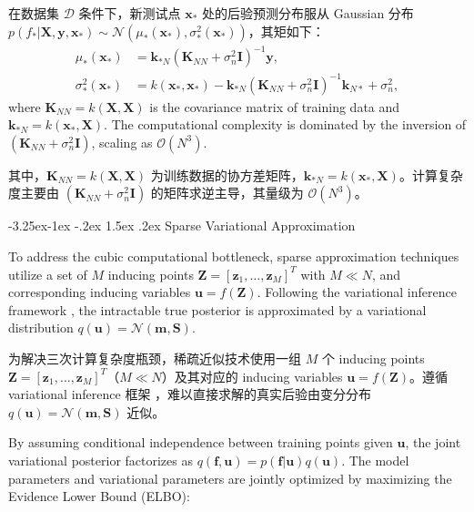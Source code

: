 \documentclass[11pt]{article}
\makeatletter
\renewcommand\subsection{\@startsection{subsection}{2}{\z@}%
                                         {-3.25ex\@plus -1ex \@minus -.2ex}%
                                         {1.5ex \@plus .2ex}%
                                         {\normalfont\fontfamily{phv}\fontsize{14}{17}\bfseries}}
\makeatother
\begin{document}
在数据集 $\mathcal{D}$ 条件下，新测试点 $\mathbf{x}_*$ 处的后验预测分布服从 Gaussian 分布 $p(f_* | \mathbf{X}, \mathbf{y}, \mathbf{x}_*) \sim \mathcal{N}(\mu_*(\mathbf{x}_*), \sigma_*^2(\mathbf{x}_*))$，其矩如下：
\begin{equation}
	\begin{aligned}
		\mu_*(\mathbf{x}_*) &= \mathbf{k}_{*N} (\mathbf{K}_{NN} + \sigma_n^2 \mathbf{I})^{-1} \mathbf{y}, \\
		\sigma_*^2(\mathbf{x}_*) &= k(\mathbf{x}_*, \mathbf{x}_*) - \mathbf{k}_{*N} (\mathbf{K}_{NN} + \sigma_n^2 \mathbf{I})^{-1} \mathbf{k}_{N*} + \sigma_n^2,
	\end{aligned}
\end{equation}
where $\mathbf{K}_{NN} = k(\mathbf{X}, \mathbf{X})$ is the covariance matrix of training data and $\mathbf{k}_{*N} = k(\mathbf{x}_*, \mathbf{X})$. The computational complexity is dominated by the inversion of $(\mathbf{K}_{NN} + \sigma_n^2 \mathbf{I})$, scaling as $\mathcal{O}(N^3)$.

其中，$\mathbf{K}_{NN} = k(\mathbf{X}, \mathbf{X})$ 为训练数据的协方差矩阵，$\mathbf{k}_{*N} = k(\mathbf{x}_*, \mathbf{X})$。计算复杂度主要由 $(\mathbf{K}_{NN} + \sigma_n^2 \mathbf{I})$ 的矩阵求逆主导，其量级为 $\mathcal{O}(N^3)$。



\subsection{Sparse Variational Approximation} \label{s:sec2.2}

To address the cubic computational bottleneck, sparse approximation techniques utilize a set of $M$ inducing points $\mathbf{Z} = [\mathbf{z}_1, \ldots, \mathbf{z}_M]^T$ with $M \ll N$, and corresponding inducing variables $\mathbf{u} = f(\mathbf{Z})$. Following the variational inference framework \citep{Titsias2009}, the intractable true posterior is approximated by a variational distribution $q(\mathbf{u}) = \mathcal{N}(\mathbf{m}, \mathbf{S})$. 

为解决三次计算复杂度瓶颈，稀疏近似技术使用一组 $M$ 个 inducing points $\mathbf{Z} = [\mathbf{z}_1, \ldots, \mathbf{z}_M]^T$（$M \ll N$）及其对应的 inducing variables $\mathbf{u} = f(\mathbf{Z})$。遵循 variational inference 框架 \citep{Titsias2009}，难以直接求解的真实后验由变分分布 $q(\mathbf{u}) = \mathcal{N}(\mathbf{m}, \mathbf{S})$ 近似。

By assuming conditional independence between training points given $\mathbf{u}$, the joint variational posterior factorizes as $q(\mathbf{f}, \mathbf{u}) = p(\mathbf{f}|\mathbf{u})q(\mathbf{u})$. The model parameters and variational parameters are jointly optimized by maximizing the Evidence Lower Bound (ELBO):
\end{document}
